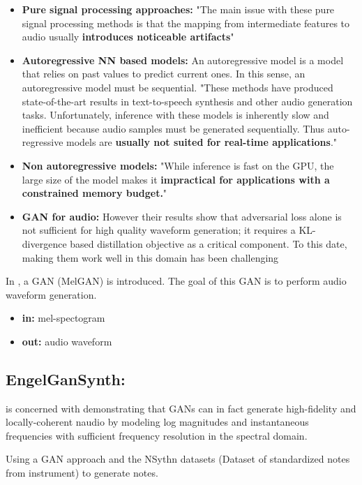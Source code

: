 \documentclass{article}
\begin{document}
\begin{itemize}
    \item \textbf{Pure signal processing approaches:} "The main issue with these pure signal processing methods is that the mapping from intermediate features to audio usually \textbf{introduces noticeable artifacts}"
    \item \textbf{Autoregressive NN based models:} An autoregressive model is a model that relies on past values to predict current ones. In this sense, an autoregressive model must be sequential. "These methods have produced state-of-the-art results in text-to-speech synthesis and other audio generation tasks. Unfortunately, inference with these models is inherently slow and inefficient because audio samples must be generated sequentially. Thus auto-regressive models are \textbf{usually not suited for real-time applications}."

    \item \textbf{Non autoregressive models:} "While inference is fast on the GPU, the large size of the model makes it \textbf{ impractical for applications with a constrained memory budget.}"
    \item \textbf{GAN for audio:} However their results show that adversarial loss alone is not sufficient for high quality waveform generation; it requires a  KL-divergence based distillation objective as a critical component. To this date, making them work well in this domain has been challenging
\end{itemize}

In \cite{NEURIPS2019_6804c9bc}, a GAN (MelGAN) is introduced. The goal of this GAN is to perform audio waveform generation.

\begin{itemize}
    \item \textbf{in:} mel-spectogram 
    \item \textbf{out:} audio waveform
\end{itemize}

\subsection{EngelGanSynth:}

\cite{engel2019gansynth} is concerned with demonstrating that GANs can in fact generate high-fidelity and locally-coherent naudio by modeling log magnitudes and instantaneous frequencies with sufficient frequency resolution in the spectral domain.

Using a GAN approach and the NSythn datasets (Dataset of standardized notes from instrument) to generate notes. 
\end{document}
